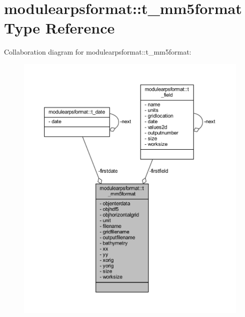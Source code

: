 \hypertarget{structmodulearpsformat_1_1t__mm5format}{}\section{modulearpsformat\+:\+:t\+\_\+mm5format Type Reference}
\label{structmodulearpsformat_1_1t__mm5format}


Collaboration diagram for modulearpsformat\+:\+:t\+\_\+mm5format\+:\nopagebreak
\begin{figure}[H]
\begin{center}
\leavevmode
\includegraphics[width=350pt]{structmodulearpsformat_1_1t__mm5format__coll__graph}
\end{center}
\end{figure}
